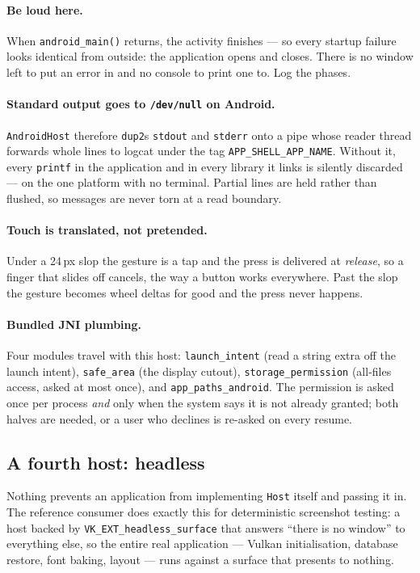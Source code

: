 \documentclass[11pt,a4paper]{article}
\begin{document}
\paragraph{Be loud here.} When \texttt{android\_main()} returns, the activity
finishes --- so every startup failure looks identical from outside: the
application opens and closes. There is no window left to put an error in and no
console to print one to. Log the phases.

\paragraph{Standard output goes to \texttt{/dev/null} on Android.}
\texttt{AndroidHost} therefore \texttt{dup2}s \texttt{stdout} and
\texttt{stderr} onto a pipe whose reader thread forwards whole lines to logcat
under the tag \texttt{APP\_SHELL\_APP\_NAME}. Without it, every
\texttt{printf} in the application and in every library it links is silently
discarded --- on the one platform with no terminal. Partial lines are held
rather than flushed, so messages are never torn at a read boundary.

\paragraph{Touch is translated, not pretended.} Under a 24\,px slop the gesture
is a tap and the press is delivered at \emph{release}, so a finger that slides
off cancels, the way a button works everywhere. Past the slop the gesture
becomes wheel deltas for good and the press never happens.

\paragraph{Bundled JNI plumbing.} Four modules travel with this host:
\texttt{launch\_intent} (read a string extra off the launch intent),
\texttt{safe\_area} (the display cutout), \texttt{storage\_permission}
(all-files access, asked at most once), and \texttt{app\_paths\_android}. The permission is asked once per process
\emph{and} only when the system says it is not already granted; both halves are
needed, or a user who declines is re-asked on every resume.

\subsection{A fourth host: headless}

Nothing prevents an application from implementing \texttt{Host} itself and
passing it in. The reference consumer does exactly this for deterministic
screenshot testing: a host backed by \texttt{VK\_EXT\_headless\_surface} that
answers ``there is no window'' to everything else, so the entire real
application --- Vulkan initialisation, database restore, font baking, layout ---
runs against a surface that presents to nothing.
\end{document}
